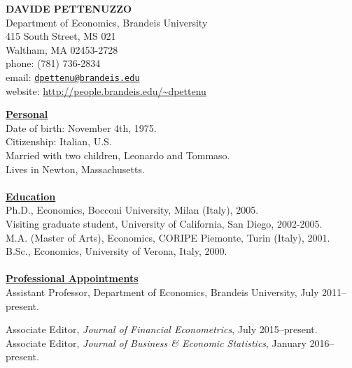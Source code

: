 \documentclass[12pt]{article}
\begin{document}
\begin{center}
\textbf{DAVIDE PETTENUZZO} \\
Department of Economics, Brandeis University \\
415 South Street, MS 021 \\
Waltham, MA 02453-2728 \\
phone: (781) 736-2834 \\
email: \href{mailto:dpettenu@brandeis.edu}{\nolinkurl{dpettenu@brandeis.edu}} \\
website: \url{http://people.brandeis.edu/~dpettenu} \\
\end{center}
\hline 
\bigskip

\underline{\textbf{Personal}}\\
Date of birth: November 4th, 1975. \\
Citizenship: Italian, U.S. \\
Married with two children, Leonardo and Tommaso. \\
Lives in Newton, Massachusetts. \\ \\ 
\underline{\textbf{Education}}\\
Ph.D., Economics, Bocconi University, Milan (Italy), 2005.\\
Visiting graduate student, University of California, San Diego, 2002-2005. \\
M.A. (Master of Arts), Economics, CORIPE Piemonte, Turin (Italy), 2001. \\
B.Sc., Economics, University of Verona, Italy, 2000.\\ \\
\underline{\textbf{Professional Appointments}}\\
Assistant Professor, Department of Economics, Brandeis University, July 2011--present.

Associate Editor, \textit{Journal of Financial Econometrics}, July 2015--present. \\
Associate Editor, \textit{Journal of Business \& Economic Statistics}, January 2016--present.
\end{document}
